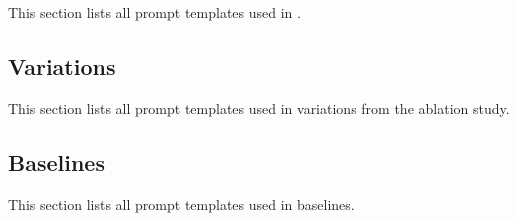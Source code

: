 \subsection{\model{}}

This section lists all prompt templates used in \model{}.



\subsection{Variations}

This section lists all prompt templates used in variations from the ablation study.



\subsection{Baselines}

This section lists all prompt templates used in baselines.

